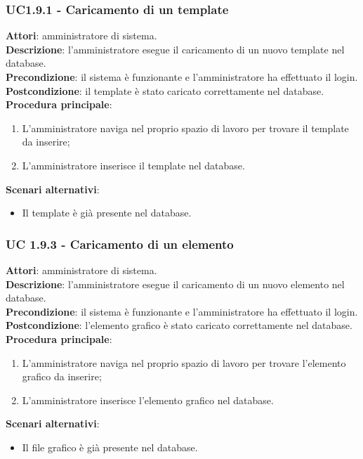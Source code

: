 \subsubsection{UC1.9.1 - Caricamento di un template}{
	\label{uc1.9.1}
	\textbf{Attori}: amministratore di sistema. \\
	\textbf{Descrizione}: l'amministratore esegue il caricamento di un nuovo template nel database. \\
	\textbf{Precondizione}: il sistema  è funzionante e l'amministratore ha effettuato il login.	\\
	\textbf{Postcondizione}: il template è stato caricato correttamente nel database.	\\
	\textbf{Procedura principale}:
	\begin{enumerate}
		\item L'amministratore naviga nel proprio spazio di lavoro  per trovare il template da inserire;
		\item L'amministratore inserisce il template nel database.
	\end{enumerate}
	\textbf{Scenari alternativi}:
	\begin{itemize}
		\item Il template è già presente nel database.
	\end{itemize}
	}
\subsubsection{UC 1.9.3 - Caricamento di un elemento}{
	\label{uc1.9.3}
	\textbf{Attori}: amministratore di sistema. \\
	\textbf{Descrizione}: l'amministratore esegue il caricamento di un nuovo elemento nel database. \\
	\textbf{Precondizione}: il sistema  è funzionante e l'amministratore ha effettuato il login.	\\
	\textbf{Postcondizione}: l'elemento grafico è stato caricato correttamente nel database.	\\
	\textbf{Procedura principale}:
	\begin{enumerate}
		\item L'amministratore naviga nel proprio spazio di lavoro per trovare l'elemento grafico da inserire;
		\item L'amministratore inserisce l'elemento grafico nel database.
	\end{enumerate}
	\textbf{Scenari alternativi}:
	\begin{itemize}
		\item Il file grafico è già presente nel database.
	\end{itemize}
	}
